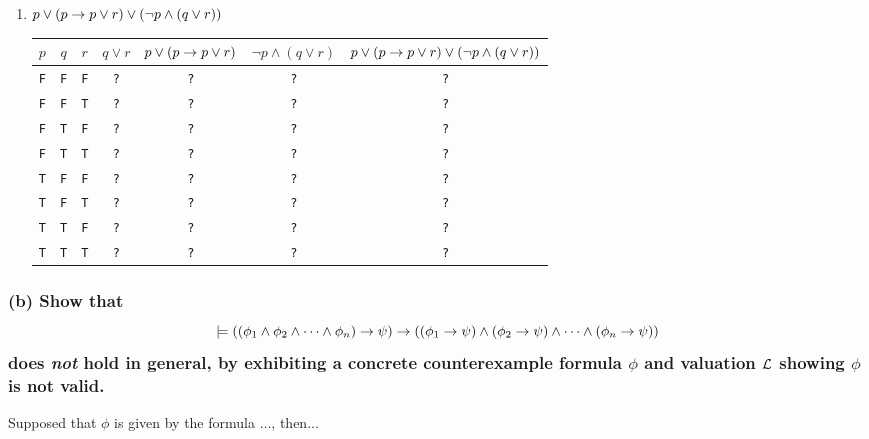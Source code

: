 \begin{enumerate}[i]
	\item
	{
	$p \lor (p \to p \lor r) \lor (\neg p \land (q \lor r))$ \\
	\begin{tabular}{cccccc|c}
		$p$ & $q$ & $r$ &
		$q \lor r$ &
		$p \lor (p \to p \lor r)$ &
		$\neg p \land (q \lor r)$ &
		$p \lor (p \to p \lor r) \lor (\neg p \land (q \lor r))$ \\ \hline
		{\tt F} & {\tt F} & {\tt F} & {\tt ?} & {\tt ?} & {\tt ?} & {\tt ?} \\
		{\tt F} & {\tt F} & {\tt T} & {\tt ?} & {\tt ?} & {\tt ?} & {\tt ?} \\
		{\tt F} & {\tt T} & {\tt F} & {\tt ?} & {\tt ?} & {\tt ?} & {\tt ?} \\
		{\tt F} & {\tt T} & {\tt T} & {\tt ?} & {\tt ?} & {\tt ?} & {\tt ?} \\
		{\tt T} & {\tt F} & {\tt F} & {\tt ?} & {\tt ?} & {\tt ?} & {\tt ?} \\
		{\tt T} & {\tt F} & {\tt T} & {\tt ?} & {\tt ?} & {\tt ?} & {\tt ?} \\
		{\tt T} & {\tt T} & {\tt F} & {\tt ?} & {\tt ?} & {\tt ?} & {\tt ?} \\
		{\tt T} & {\tt T} & {\tt T} & {\tt ?} & {\tt ?} & {\tt ?} & {\tt ?} \\
	\end{tabular}
	}
\end{enumerate}

\subsubsection*{(b) \mdseries Show that \[\models \left((\phi_1 \land \phi_2
\land \dots \land \phi_n) \to \psi \right) \to \left( (\phi_1 \to \psi)
\land (\phi_2 \to \psi) \land \dots \land (\phi_n \to \psi) \right)\] does
{\it not} hold in general, by exhibiting a concrete counterexample formula
$\phi$ and valuation $\cal L$ showing $\phi$ is not valid.} 
Supposed that $\phi$ is given by the formula $\dots$, then...